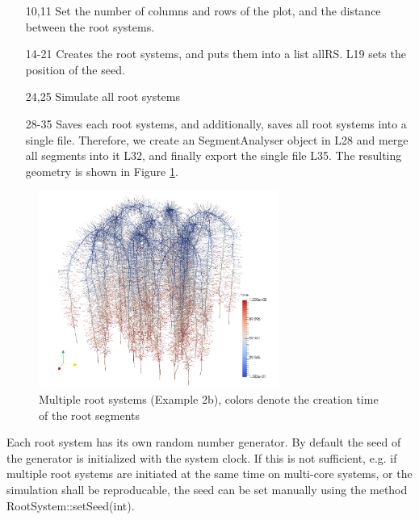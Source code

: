 \begin{itemize}

\item[10,11] Set the number of columns and rows of the plot, and the distance between the root systems.

\item[14-21] Creates the root systems, and puts them into a list allRS. L19 sets the position of the seed. 

\item[24,25] Simulate all root systems 

\item[28-35] Saves each root systems, and additionally, saves all root systems into a single file. 
Therefore, we create an SegmentAnalyser object in L28 and merge all segments into it L32, and finally export the single file L35. The resulting geometry is shown in Figure \ref{fig:multiple}.

\end{itemize}

\begin{figure}
\centering
\includegraphics[width=0.7\textwidth]{example_2b.png}
\caption{Multiple root systems (Example 2b), colors denote the creation time of the root segments} \label{fig:multiple}
\end{figure}

Each root system has its own random number generator. By default the seed of the generator is initialized with the system clock. 
If this is not sufficient, e.g. if multiple root systems are initiated at the same time on multi-core systems, or the simulation shall be reproducable, the seed can be set manually using the method RootSystem::setSeed(int).




